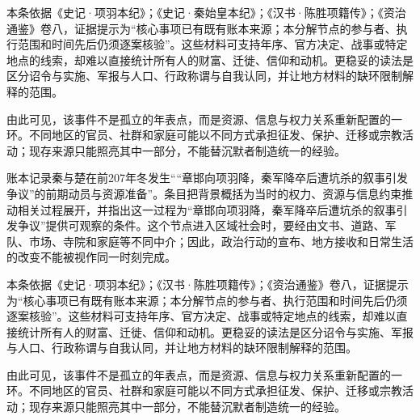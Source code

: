 本条依据《史记·项羽本纪》；《史记·秦始皇本纪》；《汉书·陈胜项籍传》；《资治通鉴》卷八，证据提示为“核心事项已有既有账本来源；本分解节点的参与者、执行范围和时间先后仍须逐案核验”。这些材料可支持年序、官方决定、战事或特定地点的线索，却难以直接统计所有人的财富、迁徙、信仰和动机。更稳妥的读法是区分诏令与实施、军报与人口、行政称谓与自我认同，并让地方材料的缺环限制解释的范围。

由此可见，该事件不是孤立的年表点，而是资源、信息与权力关系重新配置的一环。不同地区的官员、社群和家庭可能以不同方式承担征发、保护、迁移或宗教活动；现存来源只能照亮其中一部分，不能替沉默者制造统一的经验。

账本记录秦与楚在前207年冬发生““章邯向项羽降，秦军降卒后遭坑杀的叙事引发争议”的前期动员与资源准备”。条目把背景概括为当时的权力、资源与信息约束推动相关过程展开，并指出这一过程为“章邯向项羽降，秦军降卒后遭坑杀的叙事引发争议”提供可观察的条件。这个节点进入区域社会时，要经由文书、道路、军队、市场、寺院和家庭等不同中介；因此，政治行动的宣布、地方接收和日常生活的改变不能被视作同一时刻完成。

本条依据《史记·项羽本纪》；《汉书·陈胜项籍传》；《资治通鉴》卷八，证据提示为“核心事项已有既有账本来源；本分解节点的参与者、执行范围和时间先后仍须逐案核验”。这些材料可支持年序、官方决定、战事或特定地点的线索，却难以直接统计所有人的财富、迁徙、信仰和动机。更稳妥的读法是区分诏令与实施、军报与人口、行政称谓与自我认同，并让地方材料的缺环限制解释的范围。

由此可见，该事件不是孤立的年表点，而是资源、信息与权力关系重新配置的一环。不同地区的官员、社群和家庭可能以不同方式承担征发、保护、迁移或宗教活动；现存来源只能照亮其中一部分，不能替沉默者制造统一的经验。
